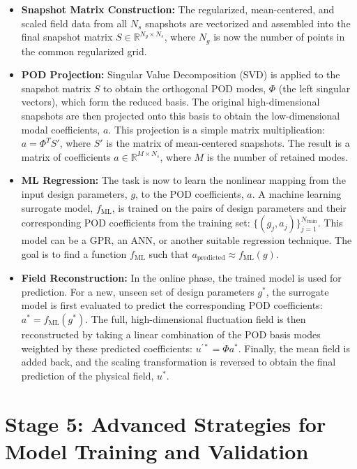 \documentclass[dsc, EN]{ufabcFHZh}
\begin{document}
\begin{itemize}
    \item \textbf{Snapshot Matrix Construction:} The regularized, mean-centered, and scaled field data from all $N_s$ snapshots are vectorized and assembled into the final snapshot matrix $S \in \mathbb{R}^{N_g \times N_s}$, where $N_g$ is now the number of points in the common regularized grid.

    \item \textbf{POD Projection:} Singular Value Decomposition (SVD) is applied to the snapshot matrix $S$ to obtain the orthogonal POD modes, $\Phi$ (the left singular vectors), which form the reduced basis. The original high-dimensional snapshots are then projected onto this basis to obtain the low-dimensional modal coefficients, $a$. This projection is a simple matrix multiplication: $a = \Phi^T S'$, where $S'$ is the matrix of mean-centered snapshots. The result is a matrix of coefficients $a \in \mathbb{R}^{M \times N_s}$, where $M$ is the number of retained modes.

    \item \textbf{ML Regression:} The task is now to learn the nonlinear mapping from the input design parameters, $g$, to the POD coefficients, $a$. A machine learning surrogate model, $f_{\text{ML}}$, is trained on the pairs of design parameters and their corresponding POD coefficients from the training set: $\{(g_j, a_j)\}_{j=1}^{N_{\text{train}}}$. This model can be a GPR, an ANN, or another suitable regression technique. The goal is to find a function $f_{\text{ML}}$ such that $a_{\text{predicted}} \approx f_{\text{ML}}(g)$.

    \item \textbf{Field Reconstruction:} In the online phase, the trained model is used for prediction. For a new, unseen set of design parameters $g^*$, the surrogate model is first evaluated to predict the corresponding POD coefficients: $a^{*} = f_{\text{ML}}(g^{*})$. The full, high-dimensional fluctuation field is then reconstructed by taking a linear combination of the POD basis modes weighted by these predicted coefficients: $u^{\prime *} = \Phi a^{*}$. Finally, the mean field is added back, and the scaling transformation is reversed to obtain the final prediction of the physical field, $u^{*}$.
\end{itemize}

\section{Stage 5: Advanced Strategies for Model Training and Validation}
\end{document}
